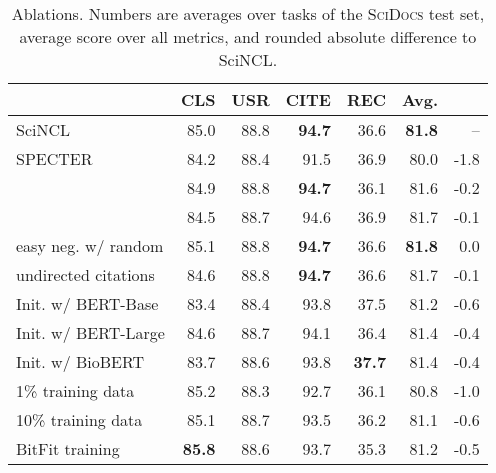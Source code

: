 \documentclass[11pt]{article}
\newcommand{\dataset}{\textsc{SciDocs}\xspace}
\newcommand{\sys}{SciNCL\xspace} \newcommand{\baselineCount}{10\xspace}
\begin{document}
\begin{table}[!t]
\footnotesize
\centering
\setlength{\tabcolsep}{3pt}
\renewcommand{\arraystretch}{1.2}
\begin{tabular}{@{}lrrrr|rr@{}}
\toprule 
 &CLS       & USR   & CITE  & REC  & Avg. &    \\ \midrule








\sys & 85.0  & 88.8  & \textbf{94.7}  & 36.6  & \textbf{81.8}  & -- \\ 
SPECTER & 84.2 & 88.4 & 91.5 & 36.9 & 80.0 & -1.8\\ 
 \hdashline
 
 & 84.9  & 88.8  & \textbf{94.7}  & 36.1  & 81.6  & -0.2  \\ 

 & 84.5  & 88.7  & 94.6  & 36.9  & 81.7  & -0.1  \\ 


easy neg. w/ random & 85.1  & 88.8  & \textbf{94.7}  & 36.6  & \textbf{81.8}  & 0.0  \\ 

undirected citations & 84.6  & 88.8  & \textbf{94.7}  & 36.6  & 81.7  & -0.1  \\ 

\hdashline

Init. w/ BERT-Base  & 83.4  & 88.4  & 93.8  & 37.5  & 81.2  & -0.6  \\ 
Init. w/ BERT-Large  & 84.6  & 88.7  & 94.1  & 36.4  & 81.4  & -0.4  \\ 
Init. w/ BioBERT  & 83.7  & 88.6  & 93.8  & \textbf{37.7}  & 81.4  & -0.4  \\ 

\hdashline

1\% training data  & 85.2  & 88.3  & 92.7  & 36.1  & 80.8  & -1.0  \\ 

10\% training data & 85.1  & 88.7  & 93.5  & 36.2  & 81.1  & -0.6  \\ 

BitFit training & \textbf{85.8}  & 88.6  & 93.7  & 35.3  & 81.2  & -0.5  \\ 



  
\bottomrule
\end{tabular}
\caption{Ablations. Numbers are averages over tasks of the \dataset test set, average score over all metrics, and rounded absolute difference to \sys.}
\label{tab:ablation}
\end{table}
\end{document}
